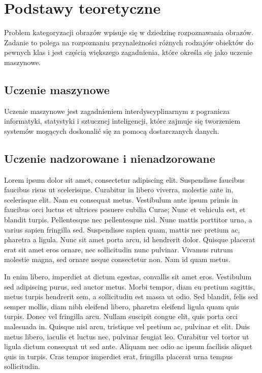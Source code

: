 \chapter{Podstawy teoretyczne}

Problem kategoryzacji obrazów wpisuje się w dziedzinę rozpoznawania obrazów. Zadanie to polega na rozpoznaniu przynależności różnych rodzajów obiektów do pewnych klas\cite{Tad91} i jest częścią większego zagadnienia, które określa się jako uczenie maszynowe.

\section{Uczenie maszynowe}

Uczenie maszynowe jest zagadnieniem interdyscyplinarnym z pogranicza informatyki, statystyki i sztucznej inteligencji, które zajmuje się tworzeniem systemów mogących doskonalić się za pomocą dostarczanych danych.
















\section{Uczenie nadzorowane i nienadzorowane}

Lorem ipsum dolor sit amet, consectetur adipiscing elit. Suspendisse faucibus faucibus risus ut scelerisque. Curabitur in libero viverra, molestie ante in, scelerisque elit. Nam eu consequat metus. Vestibulum ante ipsum primis in faucibus orci luctus et ultrices posuere cubilia Curae; Nunc et vehicula est, et blandit turpis. Pellentesque nec pellentesque nisl. Nunc mattis porttitor urna, a varius sapien fringilla sed. Suspendisse sapien quam, mattis nec pretium ac, pharetra a ligula. Nunc sit amet porta arcu, id hendrerit dolor. Quisque placerat erat sit amet eros ornare, nec sollicitudin nunc pulvinar. Vivamus rutrum molestie magna, sed ornare neque consectetur non. Nam id quam metus.

In enim libero, imperdiet at dictum egestas, convallis sit amet eros. Vestibulum sed adipiscing purus, sed auctor metus. Morbi tempor, diam eu pretium sagittis, metus turpis hendrerit sem, a sollicitudin est massa ut odio. Sed blandit, felis sed semper mollis, diam nibh eleifend libero, pharetra eleifend ligula quam quis turpis. Donec vel fringilla arcu. Nullam suscipit congue elit, quis porta orci malesuada in. Quisque nisl arcu, tristique vel pretium ac, pulvinar et elit. Duis metus libero, iaculis et luctus nec, pulvinar feugiat leo. Curabitur vel tortor ut ligula dictum consequat ut sed ante. Aliquam nec odio ac ipsum facilisis aliquet quis in turpis. Cras tempor imperdiet erat, fringilla placerat urna tempus sollicitudin.



